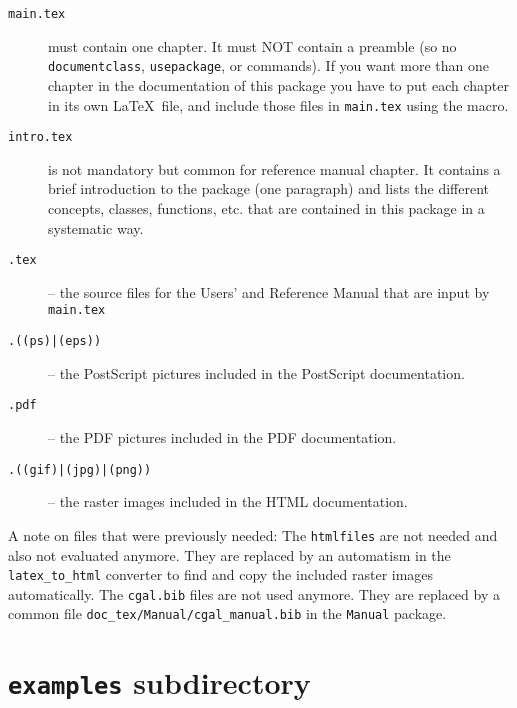 \begin{description}
 \item[{\tt main.tex}]%
       must contain one chapter. It must NOT 
      contain a preamble (so no {\tt documentclass}, {\tt usepackage}, 
      \verb|| or \verb|| commands). 
      If you want more than one chapter in the documentation of this
      package you have to put each chapter in its own \LaTeX\ file,
      and include those files in \texttt{main.tex} using the \verb||
      macro.
 \item[{\tt intro.tex}]%
      is not mandatory but common for reference manual chapter. It
      contains a brief introduction to the package (one paragraph) and
      lists the different concepts, classes, functions, etc. that are
      contained in this package in a systematic way.
 \item[{\tt *.tex}] -- the source files for the Users' and Reference
      Manual that are input by {\tt main.tex} 
 \item[{\tt *.((ps)|(eps))}] -- the PostScript pictures included in
        the PostScript documentation.
 \item[{\tt *.pdf}] -- the PDF pictures included in
        the PDF documentation.
 \item[{\tt *.((gif)|(jpg)|(png))}] -- the raster images included in
        the HTML documentation.
\end{description}

A note on files that were previously needed: The \texttt{htmlfiles} are
not needed and also not evaluated anymore. They are replaced by an
automatism in the \texttt{latex\_to\_html} converter to find and copy
the included raster images automatically. The \texttt{cgal.bib} files
are not used anymore. They are replaced by a common file
\texttt{doc\_tex/Manual/cgal\_manual.bib}  in the \texttt{Manual} package.

\section{{\tt examples} subdirectory}
\label{sec:examples_subdirectory}

